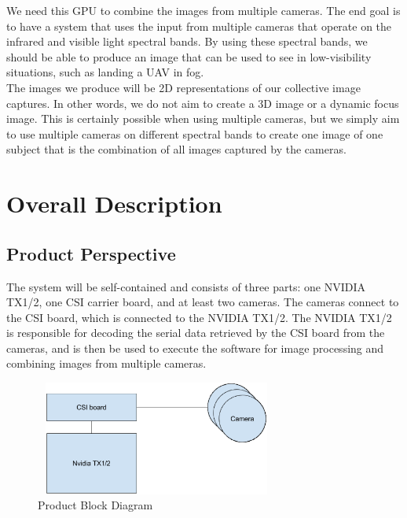 \documentclass[letterpaper,10pt,serif,draftclsnofoot,onecolumn,compsoc,titlepage]{IEEEtran}
\begin{document}
We need this GPU to combine the images from multiple cameras. The end goal is to have 
a system that uses the input from multiple cameras that operate on the infrared and 
visible light spectral bands. By using these spectral bands, we should be able to 
produce an image that can be used to see in low-visibility situations, such as landing 
a UAV in fog.\\

The images we produce will be 2D representations of our collective image captures. In 
other words, we do not aim to create a 3D image or a dynamic focus image. This is 
certainly possible when using multiple cameras, but we simply aim to use multiple 
cameras on different spectral bands to create one image of one subject that is the 
combination of all images captured by the cameras.\\


\section{Overall Description}

\subsection{Product Perspective}

The system will be self-contained and consists of three parts: one NVIDIA TX1/2, 
one CSI carrier board, and at least two cameras. The cameras connect to the CSI board, 
which is connected to the NVIDIA TX1/2. The NVIDIA TX1/2 is responsible for decoding 
the serial data retrieved by the CSI board from the cameras, and is then be used to 
execute the software for image processing and combining images from multiple cameras.\\

\begin{figure}[H]
	\centering
	\label{fig:CopyOnWriteBefore}
	\includegraphics[width=8cm,height=3.75cm]{images/block_diagram.eps}
	\caption{Product Block Diagram \label{overflow}}
\end{figure}
\end{document}
